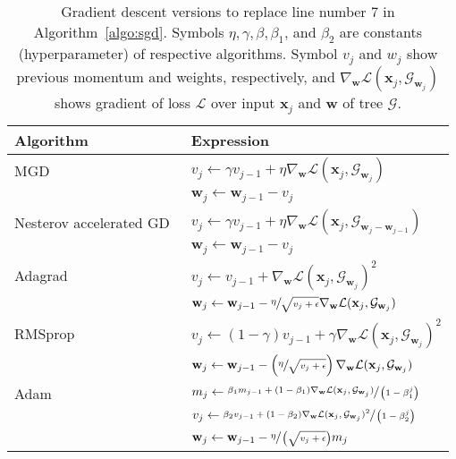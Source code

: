 \documentclass[11pt,a4paper]{article}
\begin{document}
    \begin{table}
        \centering
        \setlength{\tabcolsep}{10pt}
{\caption{Gradient descent versions to replace line number 7 in Algorithm~\ref{algo:sgd}. Symbols $ \eta, \gamma, \beta, \beta_1$, and $\beta_2 $ are constants (hyperparameter) of respective algorithms. Symbol $ v_j$ and $w_j$ show previous momentum and weights, respectively, and $ \nabla_\mathbf{w} \mathcal{L}(\mathbf{x}_j, \mathcal{G}_{\mathbf{w}_j}) $ shows gradient of loss $ \mathcal{L} $ over input $ \mathbf{x}_j $ and $ \textbf{w} $ of tree $ \mathcal{G} $.}
            \label{tab:sgds_mehods}}
        \begin{tabular}{ll}
            \toprule
            Algorithm & Expression\\ 
            \midrule
            MGD~\citep{qian1999momentum}  &  
$v_j \leftarrow \gamma v_{j - 1} + \eta \nabla_\mathbf{w} \mathcal{L}(\mathbf{x}_j, \mathcal{G}_{\mathbf{w}_j})$ \\
            & $\mathbf{w}_j \leftarrow \mathbf{w}_{j-1} - v_j $\\[7pt]
Nesterov accelerated  GD~\citep{bengio2013advances}  & 
$v_j \leftarrow \gamma v_{j - 1} + \eta \nabla_\mathbf{w} \mathcal{L}(\mathbf{x}_j, \mathcal{G}_{\mathbf{w}_j - \mathbf{w}_{j-1}})$ \\
            & $\mathbf{w}_j \leftarrow \mathbf{w}_{j-1} - v_j$\\[7pt]
Adagrad~\citep{dean2012large} & 
$v_j \leftarrow v_{j - 1} + \nabla_\mathbf{w} \mathcal{L}(\mathbf{x}_j, \mathcal{G}_{\mathbf{w}_j})^2 $ \\ 
            & $\mathbf{w}_j \leftarrow \mathbf{w}_{j-1} - \sfrac{\eta}{\sqrt{v_j + \epsilon}}  \nabla_\mathbf{w} \mathcal{L}(\mathbf{x}_j, \mathcal{G}_{\mathbf{w}_j})$\\[7pt]
RMSprop~\citep{tieleman2012lecture} & 
$v_j \leftarrow (1-\gamma)v_{j - 1} + \gamma  \nabla_\mathbf{w} \mathcal{L}(\mathbf{x}_j, \mathcal{G}_{\mathbf{w}_j})^2 $ \\
            & $\mathbf{w}_j \leftarrow \mathbf{w}_{j-1} - \left(\sfrac{\eta}{\sqrt{v_j + \epsilon}}\right)  \nabla_\mathbf{w} \mathcal{L}(\mathbf{x}_j, \mathcal{G}_{\mathbf{w}_j})$\\[7pt]
Adam~\citep{diederik2015adam} & 
$m_j \leftarrow \sfrac{\beta_1 m_{j - 1} + (1 - \beta_1)  \nabla_\mathbf{w} \mathcal{L}(\mathbf{x}_j, \mathcal{G}_{\mathbf{w}_j})}{\left(1 - \beta^j_1\right)} $ \\
            & $v_j \leftarrow \sfrac{ \beta_2 v_{j - 1} + (1 - \beta_2)   \nabla_\mathbf{w} \mathcal{L}(\mathbf{x}_j, \mathcal{G}_{\mathbf{w}_j})^2}{\left(1 - \beta^j_2\right)} $ \\
            & $\mathbf{w}_j \leftarrow \mathbf{w}_{j-1} - \sfrac{\eta}{\left(\sqrt{v_j + \epsilon}\right)} m_j$
\\
            \bottomrule
        \end{tabular} 
    \end{table}
    
\end{document}
